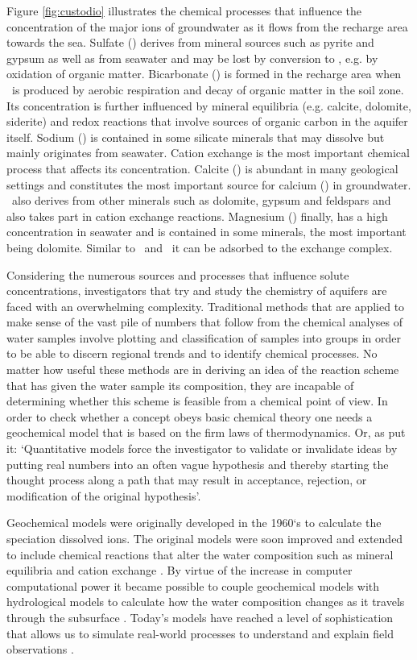 Figure \ref{fig:custodio} illustrates the chemical processes that influence the concentration of the major ions of groundwater as it flows from the recharge area towards the sea. Sulfate (\su) derives from mineral sources such as pyrite and gypsum as well as from seawater and may be lost by conversion to \hs, e.g. by oxidation of organic matter. Bicarbonate (\bi) is formed in the recharge area when \co\ is produced by aerobic respiration and decay of organic matter in the soil zone. Its concentration is further influenced by mineral equilibria (e.g. calcite, dolomite, siderite) and redox reactions that involve sources of organic carbon in the aquifer itself. Sodium (\na) is contained in some silicate minerals that may dissolve but mainly originates from seawater. Cation exchange is the most important chemical process that affects its concentration. Calcite (\cc) is abundant in many geological settings and constitutes the most important source for calcium (\ca) in groundwater. \ca\ also derives from other minerals such as dolomite, gypsum and feldspars and also takes part in cation exchange reactions. Magnesium (\mg) finally, has a high concentration in seawater and is contained in some minerals, the most important being dolomite. Similar to \na\ and \ca\ it can be adsorbed to the exchange complex.

Considering the numerous sources and processes that influence solute concentrations, investigators that try and study the chemistry of aquifers are faced with an overwhelming complexity. Traditional methods that are applied to make sense of the vast pile of numbers that follow from the chemical analyses of water samples involve plotting \citep{fetter2001} and classification of samples into groups \citep[e.g.][]{stuyfzand1993} in order to be able to discern regional trends and to identify chemical processes. No matter how useful these methods are in deriving an idea of the reaction scheme that has given the water sample its composition, they are incapable of determining whether this scheme is feasible from a chemical point of view. In order to check whether a concept obeys basic chemical theory one needs a geochemical model that is based on the firm laws of thermodynamics. Or, as \citet{lichtner96} put it: `Quantitative models force the investigator to validate or invalidate ideas by putting real numbers into an often vague hypothesis and thereby starting the thought process along a path that may result in acceptance, rejection, or modification of the original hypothesis'.

Geochemical models were originally developed in the 1960`s to calculate the speciation dissolved ions. The original models were soon improved and extended to include chemical reactions that alter the water composition such as mineral equilibria and cation exchange \citep{plummer92}. By virtue of the increase in computer computational power it became possible to couple geochemical models with hydrological models to calculate how the water composition changes as it travels through the subsurface \citep{lichtner96}. Today's models have reached a level of sophistication that allows us to simulate real-world processes to understand and explain field observations \citep{lee_windt2001}. 

